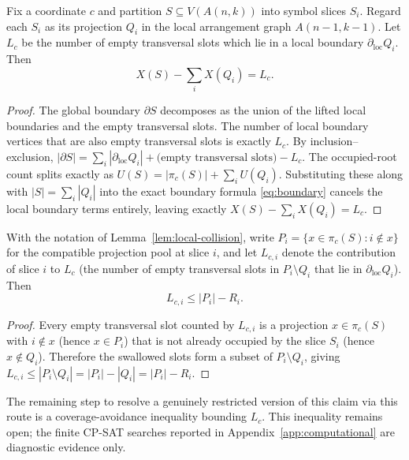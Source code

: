 \begin{lemma}\label{lem:local-collision}
Fix a coordinate $c$ and partition $S\subseteq V(A(n,k))$ into symbol slices $S_i$.
Regard each $S_i$ as its projection $Q_i$ in the local arrangement graph $A(n-1,k-1)$.
Let $L_c$ be the number of empty transversal slots which lie in a local boundary $\partial_{\mathrm{loc}}Q_i$.
Then
\[X(S)-\sum_i X(Q_i)=L_c.\]
\end{lemma}

\begin{proof}
The global boundary $\partial S$ decomposes as the union of the lifted local boundaries and the empty transversal slots. The number of local boundary vertices that are also empty transversal slots is exactly $L_c$. By inclusion--exclusion, $|\partial S|=\sum_i|\partial_{\mathrm{loc}}Q_i| + \text{(empty transversal slots)} - L_c$.
The occupied-root count splits exactly as $U(S)=|\pi_c(S)|+\sum_i U(Q_i)$. Substituting these along with $|S|=\sum_i|Q_i|$ into the exact boundary formula \eqref{eq:boundary} cancels the local boundary terms entirely, leaving exactly $X(S)-\sum_i X(Q_i)=L_c$.
\end{proof}

\begin{lemma}\label{lem:pool-envelope}
With the notation of Lemma~\ref{lem:local-collision}, write
$P_i=\{x\in\pi_c(S):i\notin x\}$ for the compatible projection pool at
slice $i$, and let $L_{c,i}$ denote the contribution of slice $i$ to
$L_c$ (the number of empty transversal slots in $P_i\setminus Q_i$ that
lie in $\partial_{\mathrm{loc}}Q_i$).  Then
\begin{equation}\label{eq:pool-envelope}
	L_{c,i}\le|P_i|-R_i.
\end{equation}
\end{lemma}

\begin{proof}
Every empty transversal slot counted by $L_{c,i}$ is a projection
$x\in\pi_c(S)$ with $i\notin x$ (hence $x\in P_i$) that is not already
occupied by the slice $S_i$ (hence $x\notin Q_i$).  Therefore the
swallowed slots form a subset of $P_i\setminus Q_i$, giving
$L_{c,i}\le|P_i\setminus Q_i|=|P_i|-|Q_i|=|P_i|-R_i$.
\end{proof}

The remaining step to resolve a genuinely restricted version of this claim via
this route is a coverage-avoidance inequality bounding $L_c$. This inequality
remains open; the finite CP-SAT searches reported in Appendix~\ref{app:computational}
are diagnostic evidence only.

